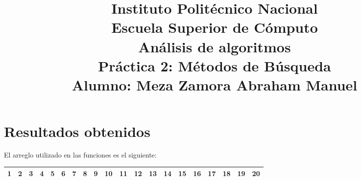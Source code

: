 \documentclass[a4paper,12pt]{article}
\begin{document}
\title{\Large Instituto Politécnico Nacional\\Escuela Superior de Cómputo\\Análisis de algoritmos\\Práctica 2: Métodos de Búsqueda\\Alumno: Meza Zamora Abraham Manuel}
\date{}
\maketitle

\section{Resultados obtenidos }
El arreglo utilizado en las funciones es el siguiente:\\
\begin{table}[h]
\centering
\begin{tabular}{ | c | c | c | c | c | c | c | c | c | c |  c | c | c | c | c | c | c | c | c | c | }
\hline
1 & 2 & 3 & 4 & 5 & 6 & 7 & 8 & 9 & 10 & 11 & 12 & 13 & 14 & 15 & 16 & 17 & 18 & 19 &  20\\
\hline
\end{tabular}
\end{table}
\end{document}
